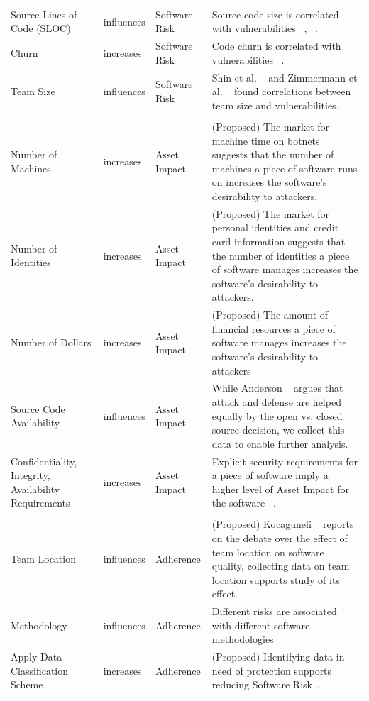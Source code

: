 \begin{table}[!htbp]
\begin{small}
\begin{tabular}{@{\extracolsep{5pt}}p{3cm}p{1cm}p{2cm}p{10cm}}
			Source Lines of Code (SLOC)	& influences	& Software Risk & Source code size is correlated with vulnerabilities ~\cite{shin2011evaluating}, ~\cite{alhazmi2007measuring}. \\
			Churn &	increases &	Software Risk  &  Code churn is correlated with vulnerabilities ~\cite{shin2011evaluating}.\\
			Team Size	& influences	& Software Risk & Shin et al. ~\cite{shin2011evaluating} and Zimmermann et al. ~\cite{zimmerman2010searching} found correlations between team size and vulnerabilities. \\			
			\hline \\[-1.8ex] 
			Number of Machines &	increases &	Asset Impact & (Proposed) The market for machine time on botnets suggests that the number of machines a piece of software runs on increases the software's desirability to attackers. \\
			Number of Identities &	increases &	Asset Impact	 &  (Proposed) The market for personal identities and credit card information suggests that the number of identities a piece of software manages increases the software's desirability to attackers.\\
			Number of Dollars &	increases &	Asset Impact	 & (Proposed) The amount of financial resources a piece of software manages increases the software's desirability to attackers\\
			Source Code Availability	& influences &	Asset Impact & While Anderson ~\cite{anderson2002security} argues that attack and defense
			are helped equally by the open vs. closed source decision, we collect this data to enable further analysis.  \\
			Confidentiality, Integrity, Availability Requirements &	increases &	Asset Impact	& Explicit security requirements for a piece of software imply a higher level of Asset Impact for the software ~\cite{mell2007complete}. \\
			\hline \\[-1.8ex]
			Team Location &	influences &	Adherence	& (Proposed)  Kocaguneli ~\cite{kocaguneli2013distributed} reports on the debate over the effect of team location on software quality, collecting data on team location supports study of its effect. \\
			Methodology	& influences &	Adherence	& Different risks are associated with different software methodologies~\cite{williams2004xpef,jones2000software} \\
			Apply Data Classification Scheme & increases & 	Adherence & (Proposed) Identifying data in need of protection supports reducing Software Risk~\cite{morrison2017surveying}.\\	

\end{tabular}
\end{small}
\end{table}

